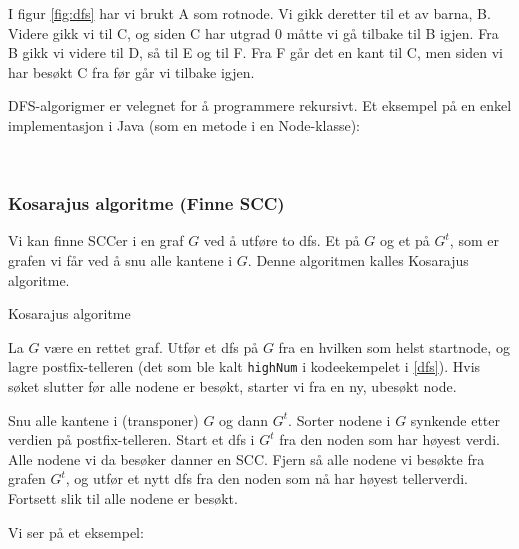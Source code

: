 I figur \ref{fig:dfs} har vi brukt A som rotnode. Vi gikk deretter til et av barna, B. Videre gikk vi til C, og siden C har utgrad 0 måtte vi gå tilbake til B igjen. Fra B gikk vi videre til D, så til E og til F. Fra F går det en kant til C, men siden vi har besøkt C fra før går vi tilbake igjen. 

DFS-algorigmer er velegnet for å programmere rekursivt. Et eksempel på en enkel implementasjon i Java (som en metode i en Node-klasse):

~\\

\subsubsection{Kosarajus algoritme (Finne SCC)}
Vi kan finne SCCer i en graf $ G $ ved å utføre to dfs. Et på $ G $ og et på $ G^t $, som er grafen vi får ved å snu alle kantene i $ G $. Denne algoritmen kalles Kosarajus algoritme.

\begin{teorem} Kosarajus algoritme

La $ G $ være en rettet graf. Utfør et dfs på $ G $ fra en hvilken som helst startnode, og lagre postfix-telleren (det som ble kalt \verb|highNum| i kodeekempelet i \ref{dfs}). Hvis søket slutter før alle nodene er besøkt, starter vi fra en ny, ubesøkt node.

Snu alle kantene i (transponer) $ G $ og dann $ G^t $. Sorter nodene i $ G $ synkende etter verdien på postfix-telleren. Start et dfs i $ G^t $ fra den noden som har høyest verdi. Alle nodene vi da besøker danner en SCC. Fjern så alle nodene vi besøkte fra grafen $ G^t $, og utfør et nytt dfs fra den noden som nå har høyest tellerverdi. Fortsett slik til alle nodene er besøkt. 
\end{teorem}


Vi ser på et eksempel:

